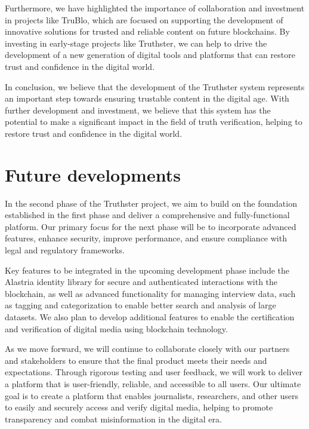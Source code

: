\documentclass[target=mst,aauheader=]{thud}
\begin{document}
Furthermore, we have highlighted the importance of collaboration and investment in projects like TruBlo, which are focused on supporting the development of innovative solutions for trusted and reliable content on future blockchains. By investing in early-stage projects like Truthster, we can help to drive the development of a new generation of digital tools and platforms that can restore trust and confidence in the digital world.

In conclusion, we believe that the development of the Truthster system represents an important step towards ensuring trustable content in the digital age. With further development and investment, we believe that this system has the potential to make a significant impact in the field of truth verification, helping to restore trust and confidence in the digital world.

\section{Future developments}

In the second phase of the Truthster project, we aim to build on the foundation established in the first phase and deliver a comprehensive and fully-functional platform. Our primary focus for the next phase will be to incorporate advanced features, enhance security, improve performance, and ensure compliance with legal and regulatory frameworks.

Key features to be integrated in the upcoming development phase include the Alastria identity library for secure and authenticated interactions with the blockchain, as well as advanced functionality for managing interview data, such as tagging and categorization to enable better search and analysis of large datasets. We also plan to develop additional features to enable the certification and verification of digital media using blockchain technology.

As we move forward, we will continue to collaborate closely with our partners and stakeholders to ensure that the final product meets their needs and expectations. Through rigorous testing and user feedback, we will work to deliver a platform that is user-friendly, reliable, and accessible to all users. Our ultimate goal is to create a platform that enables journalists, researchers, and other users to easily and securely access and verify digital media, helping to promote transparency and combat misinformation in the digital era.
\appendix
\end{document}
